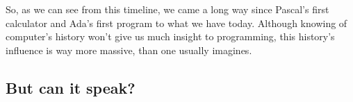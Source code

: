 \documentclass{article}
\begin{document}
            So, as we can see from this timeline, we came a long way since Pascal's first calculator and Ada's first program to what we have today. Although knowing of computer's
            history won't give us much insight to programming, this history's influence is way more massive, than one usually imagines.  

            \newpage
        \subsection{But can it speak?}
            \newpage

    
\end{document}
